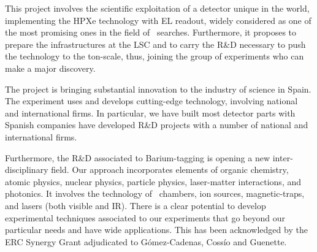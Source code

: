 

This project involves the scientific exploitation of a detector unique in the world, implementing the HPXe technology with EL readout, widely considered as one of the most promising ones in the field of \bbonu\ searches. Furthermore, it proposes to prepare the infrastructures at the LSC and to carry the R\&D necessary to push the technology to the ton-scale, thus, joining the group of experiments who can make a major discovery. 

\indent

The project is bringing substantial innovation to the industry of science in Spain. The experiment uses and develops cutting-edge technology, involving national and international firms. In particular, we have built most detector parts with Spanish companies have developed R\&D  projects with a number of national and international firms.

\indent

Furthermore, the R\&D associated to Barium-tagging is opening a new inter-disciplinary field. Our approach incorporates elements of organic chemistry, atomic physics, nuclear physics, particle physics, laser-matter interactions, and photonics. It involves the technology of \HPXeEL\ chambers, ion sources, magnetic-traps, and lasers (both visible and IR). There is a clear potential to develop experimental techniques associated to our experiments that go beyond our particular needs and have wide applications. This has been acknowledged by the ERC Synergy Grant adjudicated to G\'omez-Cadenas, Coss\'io and Guenette. 